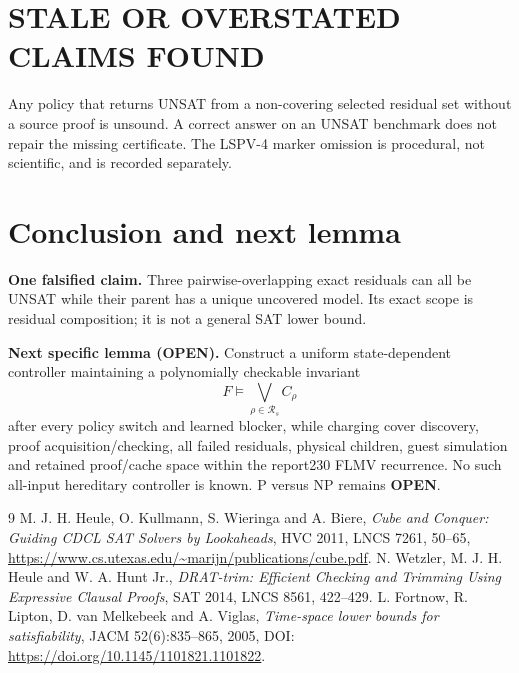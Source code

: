 \documentclass[11pt]{article}
\newcommand{\OPEN}{\textbf{OPEN}}
\begin{document}
\section{STALE OR OVERSTATED CLAIMS FOUND}
Any policy that returns UNSAT from a non-covering selected residual set without
a source proof is unsound.  A correct answer on an UNSAT benchmark does not
repair the missing certificate.  The LSPV-4 marker omission is procedural, not
scientific, and is recorded separately.

\section{Conclusion and next lemma}
\textbf{One falsified claim.}  Three pairwise-overlapping exact residuals can
all be UNSAT while their parent has a unique uncovered model.  Its exact scope
is residual composition; it is not a general SAT lower bound.

\textbf{Next specific lemma (OPEN).}  Construct a uniform state-dependent
controller maintaining a polynomially checkable invariant
\[
F\models\bigvee_{\rho\in\mathcal R_s}C_\rho
\]
after every policy switch and learned blocker, while charging cover discovery,
proof acquisition/checking, all failed residuals, physical children, guest
simulation and retained proof/cache space within the report230 FLMV recurrence.
No such all-input hereditary controller is known.  P versus NP remains \OPEN.

\begin{thebibliography}{9}
 M. J. H. Heule, O. Kullmann, S. Wieringa and A. Biere,
\emph{Cube and Conquer: Guiding CDCL SAT Solvers by Lookaheads}, HVC 2011,
LNCS 7261, 50--65, \url{https://www.cs.utexas.edu/~marijn/publications/cube.pdf}.
 N. Wetzler, M. J. H. Heule and W. A. Hunt Jr.,
\emph{DRAT-trim: Efficient Checking and Trimming Using Expressive Clausal Proofs},
SAT 2014, LNCS 8561, 422--429.
 L. Fortnow, R. Lipton, D. van Melkebeek and A. Viglas,
\emph{Time-space lower bounds for satisfiability}, JACM 52(6):835--865, 2005,
DOI: \url{https://doi.org/10.1145/1101821.1101822}.
\end{thebibliography}
\end{document}
